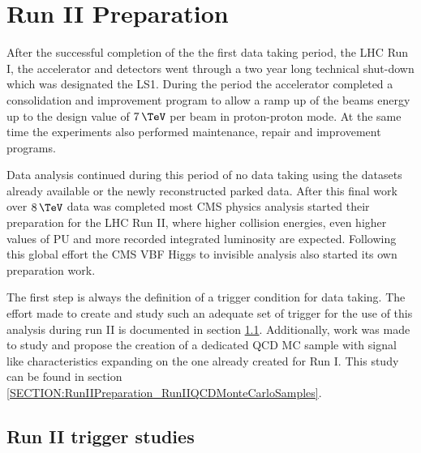 \chapter{Run II Preparation}
\label{CHAPTER:RunIIPreparation}

\glsresetall %

After the successful completion of the the first data taking period, the \gls{LHC} Run I, the accelerator and detectors went through a two year long technical shut-down which was designated the \gls{LS1}. During the period the accelerator completed a consolidation and improvement program to allow a ramp up of the beams energy up to the design value of $7\,\TeV$ per beam in proton-proton mode. At the same time the experiments also performed maintenance, repair and improvement programs. 

Data analysis continued during this period of no data taking using the datasets already available or the newly reconstructed parked data. After this final work over $8\,\TeV$ data was completed most \gls{CMS} physics analysis started their preparation for the \gls{LHC} Run II, where higher collision energies, even higher values of \gls{PU} and more recorded integrated luminosity are expected. Following this global effort the \gls{CMS} \gls{VBF} Higgs to invisible analysis also started its own preparation work. 

The first step is always the definition of a trigger condition for data taking. The effort made to create and study such an adequate set of trigger for the use of this analysis during run II is documented in section \ref{SECTION:RunIITriggerStudies}. Additionally, work was made to study and propose the creation of a dedicated \gls{QCD} \gls{MC} sample with signal like characteristics expanding on the one already created for Run I. This study can be found in section \ref{SECTION:RunIIPreparation_RunIIQCDMonteCarloSamples}.

\section{Run II trigger studies}
\label{SECTION:RunIITriggerStudies}

% 
%

